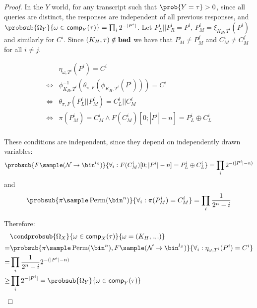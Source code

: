 \documentclass[eprint.tex]{subfiles}
\begin{document}
\begin{proof}
    In the $Y$ world, for any transcript such that $\prob{Y = \tau} > 0$,
    since all queries are distinct, the responses are independent of all
    previous responses, and
    $\probsub{\Omega_Y}{\omega \in \comp_Y(\tau)} = \prod_i 2^{-|P^i|}$.
    Let $P_L^i || P_R^i = P^i$, $P_M^i = \xi_{K_H, T^i}(P^i)$ and similarly for $C^i$.
    Since $(K_H, \tau) \notin \operatorname{\mathbf{bad}}$ we have that $P_M^i \neq P_M^j$
    and $C_M^i \neq C_M^j$ for all $i \neq j$.

    \begin{align*}
        & \eta_{\omega, T^i}(P^i) = C^i\\
        \Leftrightarrow & \phi_{K_H,T^i}^{-1}(\theta_{\pi, F}(\phi_{K_H,T^i}(P^i))) = C^i\\
        \Leftrightarrow & \theta_{\pi, F}(P_L^i || P_M^i) = C_L^i || C_M^i \\
        \Leftrightarrow & \pi(P_M^i) = C_M^i \wedge F(C_M^i)[0;|P^i| - n] = P_L^i \oplus C_L^i \\
    \end{align*}

    These conditions are independent, since they depend on independently drawn
    variables:
    \begin{displaymath}
        \probsub{
            F \sample (\mathcal{N} \rightarrow \bin^{l_S})
        }{
            \forall_i : F(C_M^i)[0;|P^i| - n] = P_L^i \oplus C_L^i
        } = \prod_i 2^{-(|P^i| - n)}
    \end{displaymath}
    and
    \begin{displaymath}
        \probsub{
            \pi \sample \Perm(\bin^n)
        }{
            \forall_i : \pi(P_M^i) = C_M^i
        } = \prod_i \frac{1}{2^n - i}
    \end{displaymath}

    Therefore:
    \begin{align*}
        &\condprobsub{\Omega_X}{\omega \in \comp_X(\tau)}{\omega = (K_H, ., .)} \\
        =& \probsub{
            \pi \sample \Perm(\bin^n),
            F \sample (\mathcal{N} \rightarrow \bin^{l_S})
        }{
            \forall_i : \eta_{\omega, T^i}(P^i) = C^i
        } \\
        =& \prod_i \frac{1}{2^n - i}2^{-(|P^i| - n)} \\
        \geq & \prod_i 2^{-|P^i|} = \probsub{\Omega_Y}{\omega \in \comp_Y(\tau)}\\
    \end{align*}
\end{proof}
\end{document}
